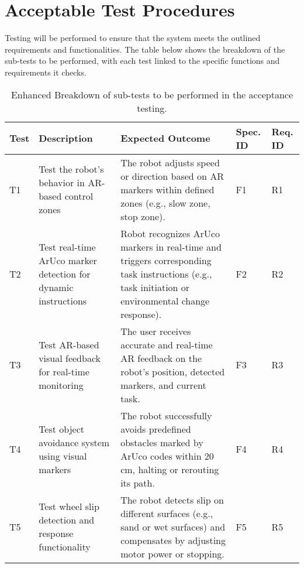 \section{Acceptable Test Procedures}

Testing will be performed to ensure that the system meets the outlined requirements and functionalities. The table below shows the breakdown of the sub-tests to be performed, with each test linked to the specific functions and requirements it checks.

\begin{table}[ht]
	\centering
	\caption{Enhanced Breakdown of sub-tests to be performed in the acceptance testing.}
	\label{tab:testing}
	\begin{tabular}{|p{0.8cm}|p{3.6cm}|p{7.5cm}|p{0.9cm}|p{0.9cm}|}
		\hline
		\textbf{Test} & \textbf{Description} & \textbf{Expected Outcome} & \textbf{Spec. ID} & \textbf{Req. ID} \\ \hline
		T1 & Test the robot’s behavior in AR-based control zones & The robot adjusts speed or direction based on AR markers within defined zones (e.g., slow zone, stop zone). & F1 & R1 \\ \hline
		T2 & Test real-time ArUco marker detection for dynamic instructions & Robot recognizes ArUco markers in real-time and triggers corresponding task instructions (e.g., task initiation or environmental change response). & F2 & R2 \\ \hline
		T3 & Test AR-based visual feedback for real-time monitoring & The user receives accurate and real-time AR feedback on the robot’s position, detected markers, and current task. & F3 & R3 \\ \hline
		T4 & Test object avoidance system using visual markers & The robot successfully avoids predefined obstacles marked by ArUco codes within 20 cm, halting or rerouting its path. & F4 & R4 \\ \hline
		T5 & Test wheel slip detection and response functionality & The robot detects slip on different surfaces (e.g., sand or wet surfaces) and compensates by adjusting motor power or stopping. & F5 & R5 \\ \hline
	\end{tabular}
\end{table}



